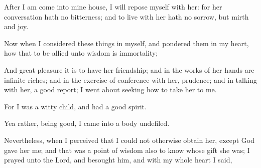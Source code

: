 {\par }{\PP {}After I am come into mine house, I will repose myself with her: for her conversation hath no bitterness; and to live with her hath no sorrow, but mirth and joy.
\par }{\PP {}Now when I considered these things in myself, and pondered them in my heart, how that to be allied unto wisdom is immortality;
\par }{\PP {}And great pleasure it is to have her friendship; and in the works of her hands are infinite riches; and in the exercise of conference with her, prudence; and in talking with her, a good report; I went about seeking how to take her to me.
\par }{\PP {}For I was a witty child, and had a good spirit.
\par }{\PP {}Yea rather, being good, I came into a body undefiled.
\par }{\PP {}Nevertheless, when I perceived that I could not otherwise obtain her, except God gave her me; and that was a point of wisdom also to know whose gift she was; I prayed unto the Lord, and besought him, and with my whole heart I said,

}
